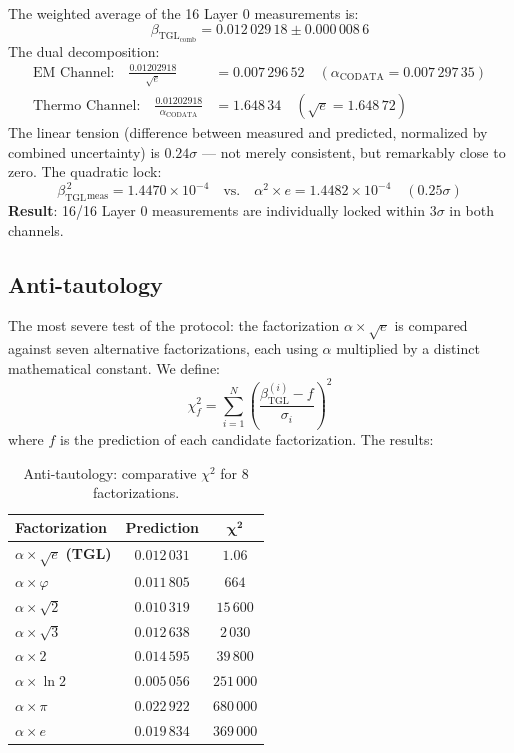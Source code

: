 \documentclass[12pt,a4paper,twoside]{article}
\newcommand{\betatgl}{\beta_{\!\scriptscriptstyle\mathrm{TGL}}}
\begin{document}
The weighted average of the 16 Layer 0 measurements is:
%
\begin{equation}
\betatgl_{\text{comb}} = 0.012\,029\,18 \pm 0.000\,008\,6
\end{equation}
%
The dual decomposition:
%
\begin{align}
\text{EM Channel:} \quad \frac{0.01202918}{\sqrt{e}} &= 0.007\,296\,52 \quad (\alpha_{\text{CODATA}} = 0.007\,297\,35) \\
\text{Thermo Channel:} \quad \frac{0.01202918}{\alpha_{\text{CODATA}}} &= 1.648\,34 \quad (\sqrt{e} = 1.648\,72)
\end{align}
%
The linear tension (difference between measured and predicted, normalized by combined uncertainty) is $0.24\sigma$ --- not merely consistent, but remarkably close to zero. The quadratic lock:
%
\begin{equation}
\betatgl^{\,2}_{\text{meas}} = 1.4470 \times 10^{-4} \quad \text{vs.} \quad \alpha^2 \times e = 1.4482 \times 10^{-4} \quad (0.25\sigma)
\end{equation}
%
\textbf{Result}: 16/16 Layer 0 measurements are individually locked within $3\sigma$ in both channels.


\subsection{Anti-tautology}
\label{subsec:antitautologia}

The most severe test of the protocol: the factorization $\alpha \times \sqrt{e}$ is compared against seven alternative factorizations, each using $\alpha$ multiplied by a distinct mathematical constant. We define:
%
\begin{equation}
\chi^2_f = \sum_{i=1}^{N} \left(\frac{\betatgl^{(i)} - f}{\sigma_i}\right)^{\!2}
\end{equation}
%
where $f$ is the prediction of each candidate factorization. The results:

\begin{table}[H]
\centering
\caption{Anti-tautology: comparative $\chi^2$ for 8 factorizations.}
\label{tab:anti_tautologia}
\begin{tabular}{lcc}
\toprule
\textbf{Factorization} & \textbf{Prediction} & $\boldsymbol{\chi^2}$ \\
\midrule
$\alpha \times \sqrt{e}$ \textbf{(TGL)} & $0.012\,031$ & $\boldsymbol{1.06}$ \\
\midrule
$\alpha \times \varphi$ & $0.011\,805$ & $664$ \\
$\alpha \times \sqrt{2}$ & $0.010\,319$ & $15\,600$ \\
$\alpha \times \sqrt{3}$ & $0.012\,638$ & $2\,030$ \\
$\alpha \times 2$ & $0.014\,595$ & $39\,800$ \\
$\alpha \times \ln 2$ & $0.005\,056$ & $251\,000$ \\
$\alpha \times \pi$ & $0.022\,922$ & $680\,000$ \\
$\alpha \times e$ & $0.019\,834$ & $369\,000$ \\
\bottomrule
\end{tabular}
\end{table}
\end{document}
